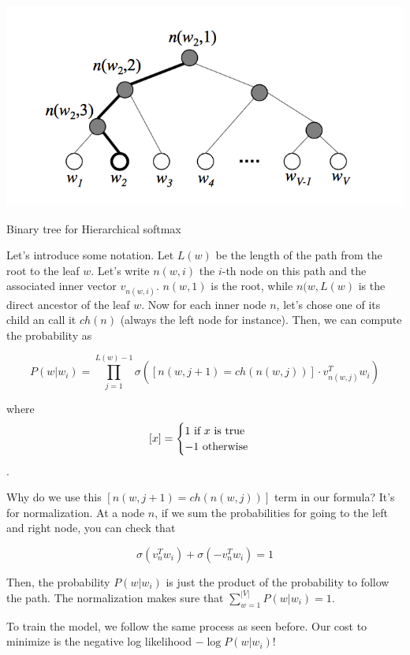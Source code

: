 \documentclass[nobib]{tufte-handout}
\begin{document}
\begin{marginfigure}%
  \includegraphics[width=\linewidth]{tree}
  \caption{Binary tree for Hierarchical softmax}
  \label{fig:tree}
\end{marginfigure}


Let's introduce some notation. Let $ L(w) $ be the length of the path from the root to the leaf $ w $. Let's write $ n(w, i) $ the $i$-th node on this path and the associated inner vector $ v_{n(w,i)}  $. $n(w, 1)$ is the root, while $n(w, L(w)$ is the direct ancestor of the leaf $ w $. Now for each inner node $ n $, let's chose one of its child an call it $ ch(n) $ (always the left node for instance). Then, we can compute the probability as 

$$ P(w | w_i) = \prod_{j=1}^{L(w) - 1} \sigma([n(w, j+1) = ch(n(w, j))] \cdot v_{n(w,j)}^T w_i)  $$

where $$[x]  = \begin{cases}
1 \text{ if $ x $ is true}\\
-1 \text{ otherwise}
\end{cases} $$.

Why do we use this $ [n(w, j+1) = ch(n(w, j))]$ term in our formula? It's for normalization. At a node $ n $, if we sum the probabilities for going to the left and right node, you can check that

$$ \sigma(v_n^T w_i) + \sigma(- v_n^T w_i) = 1 $$ 

Then, the probability $ P(w | w_i) $ is just the product of the probability to follow the path. The normalization makes sure that $ \sum_{w=1}^{|V|} P(w| w_i) = 1 $. 

To train the model, we follow the same process as seen before. Our cost to minimize is the negative log likelihood $ - \log P(w| w_i) $!


\nocite{*}
\footnotesize


\end{document}
